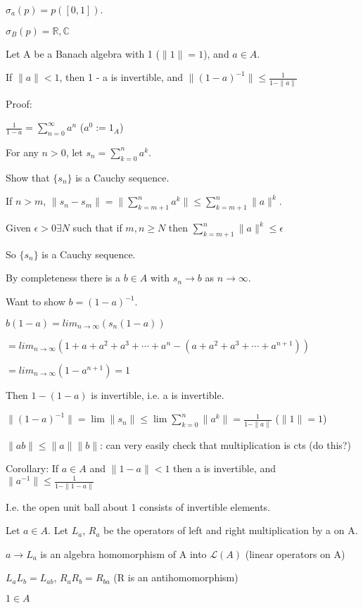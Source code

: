 \documentclass[12pt]{article}
\begin{document}
$\sigma_a(p) = p([0, 1])$.

$\sigma_B(p) = \mathds{R}, \mathds{C}$

\noindent
Let A be a Banach algebra with 1 ($\|1\| = 1$), and $a \in A$.

If $\|a\| < 1$, then 1 - a is invertible, and $\|(1 - a)^{-1}\| \leq \frac{1}{1 - \|a\|}$

\noindent
Proof:

$\frac{1}{1 - a} = \sum_{n = 0}^{\infty} a^n$ ($a^0 := 1_A$)

For any $n > 0$, let $s_n = \sum_{k = 0}^na^k$.

Show that $\{s_n\}$ is a Cauchy sequence.

If $n > m$, $\|s_n - s_m\| = \|\sum_{k = m + 1}^na^k\| \leq \sum_{k = m + 1}^n \|a\|^k$.

Given $\epsilon > 0 \exists N$ such that if $m, n \geq N$ then $\sum_{k = m + 1}^n \|a\|^k \leq \epsilon$

So $\{s_n\}$ is a Cauchy sequence.

By completeness there is a $b \in A$ with $s_n \to b$ as $n \to \infty$.

Want to show $b = (1 - a)^{-1}$.

$b(1 - a) = lim_{n \to \infty}(s_n(1 - a))$

$ = lim_{n \to \infty}(1 + a + a^2 + a^3 + \cdots+a^n - (a + a^2 + a^3 + \cdots + a^{n + 1}))$

$= lim_{n \to \infty}(1 - a^{n + 1}) = 1$

Then $1 - (1 - a)$ is invertible, i.e. a is invertible.

$\|(1 - a)^{-1}\| = \lim\|s_n\| \leq \lim\sum_{k = 0}^n\|a^k\| = \frac{1}{1 - \|a\|}$  ($\|1\| = 1$)

\noindent
$\|ab\| \leq \|a\|\|b\|$: can very easily check that multiplication is cts (do this?)

\noindent
Corollary: If $a \in A$ and $\|1 - a\| < 1$ then a is invertible, and $\|a^{-1}\| \leq \frac{1}{1 - \|1 - a\|}$

I.e. the open unit ball about 1 consists of invertible elements.

\noindent
Let $a \in A$. Let $L_a$, $R_a$ be the operators of left and right multiplication by a on A.

$a \to L_a$ is an algebra homomorphism of A into $\mathscr{L}(A)$ (linear operators on A)

$L_aL_b = L_{ab}$, $R_aR_b = R_{ba}$ (R is an antihomomorphism)

$1 \in A$
\end{document}
